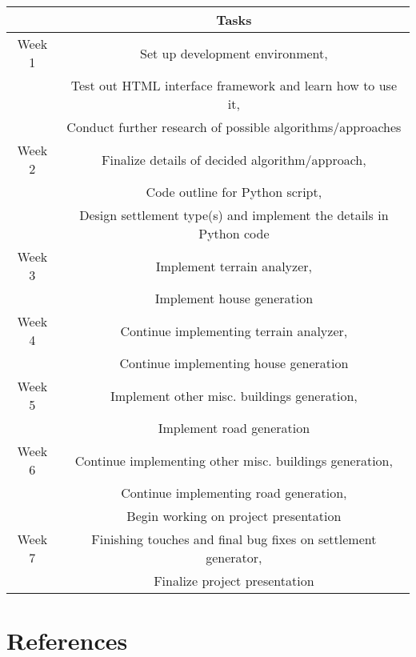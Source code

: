 \documentclass[11pt, oneside]{article}
\begin{document}
\begin{center}
\begin{tabular}{| c | c |} 
 	\hline
 	  & Tasks \\ [0.5ex] 
 	\hline\hline
	Week 1 & Set up development environment, \\
	 & Test out HTML interface framework and learn how to use it, \\
	 & Conduct further research of possible algorithms/approaches \\
	\hline
	Week 2 & Finalize details of decided algorithm/approach, \\
	 & Code outline for Python script, \\
	 & Design settlement type(s) and implement the details in Python code \\
	\hline
	Week 3 & Implement terrain analyzer, \\ 
	 & Implement house generation \\
	\hline
	Week 4 & Continue implementing terrain analyzer, \\ 
	 & Continue implementing house generation \\
	\hline
	Week 5 & Implement other misc. buildings generation, \\
	 & Implement road generation \\
	\hline
	Week 6 & Continue implementing other misc. buildings generation, \\
	 & Continue implementing road generation, \\
	 & Begin working on project presentation \\
	\hline
	Week 7 & Finishing touches and final bug fixes on settlement generator, \\
	 & Finalize project presentation \\
	\hline
\end{tabular}
\end{center}

\newpage


\section{References}
\label{references}
\nocite{*}
\printbibliography[heading=none]
\end{document}
